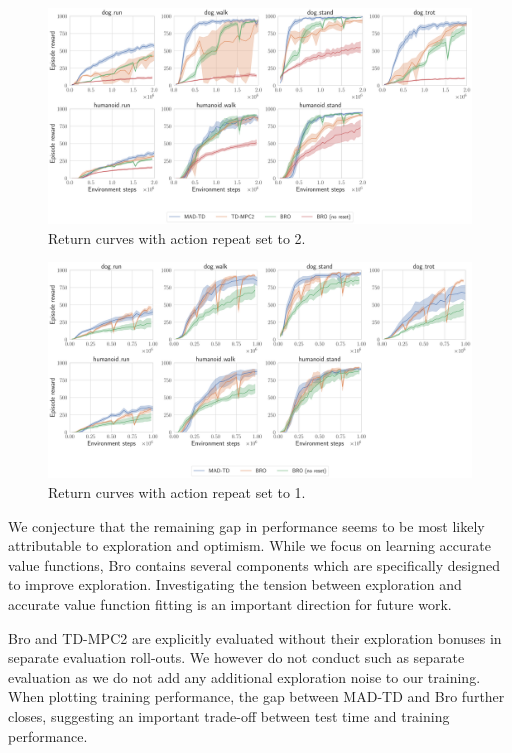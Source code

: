 \begin{figure}[H]
    \centering
    \includegraphics[width=0.8\linewidth]{figures/mad-td/hard_all_fs_2.pdf}
    \caption{Return curves with action repeat set to 2.}
    \label{fig:mad:hard_all_fs_2}
\end{figure}

\begin{figure}[H]
    \centering
    \includegraphics[width=0.8\linewidth]{figures/mad-td/hard_all_fs_1.pdf}
    \caption{Return curves with action repeat set to 1.}
    \label{fig:mad:hard_all_fs_1}
\end{figure}

We conjecture that the remaining gap in performance seems to be most likely attributable to exploration and optimism.
While we focus on learning accurate value functions, Bro contains several components which are specifically designed to improve exploration.
Investigating the tension between exploration and accurate value function fitting is an important direction for future work.

Bro and TD-MPC2 are explicitly evaluated without their exploration bonuses in separate evaluation roll-outs.
We however do not conduct such as separate evaluation as we do not add any additional exploration noise to our training.
When plotting training performance, the gap between MAD-TD and Bro further closes, suggesting an important trade-off between test time and training performance.

